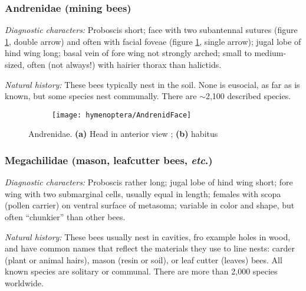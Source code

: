 \subsubsection{Andrenidae (mining bees)}
\noindent{}\textit{Diagnostic characters:} Proboscis short; face with two subantennal sutures (figure \ref{fig:andrenid1}, double arrow) and often with facial foveae (figure \ref{fig:andrenid1}, single arrow); jugal lobe of hind wing long; basal vein of fore wing not strongly arched; small to medium-sized, often (not always!) with hairier thorax than halictids.\vspace{3mm}

\noindent{}\textit{Natural history:} These bees typically nest in the soil. None is eusocial, as far as is known, but some species nest communally. There are $\sim$2,100 described species.

\begin{figure}[ht!]
    \centering
    \begin{subfigure}[ht!]{0.26\textwidth}
        \texttt{[image: hymenoptera/AndrenidFace]}
        \caption{}
        \label{fig:andrenid1}
    \end{subfigure}
    \qquad
    \begin{subfigure}[ht!]{0.35\textwidth}
        \caption{}
        \label{fig:andrenid2}
    \end{subfigure}
    \caption{Andrenidae. \textbf{(a)} Head in anterior view \citep[][pg. 313]{goulet1993hymenoptera}; \textbf{(b)} habitus \citep[][Fig. 116]{goulet1993hymenoptera}}\label{fig:andrenids}
\end{figure}

\subsubsection{Megachilidae (mason, leafcutter bees, \textit{etc}.)}
\noindent{}\textit{Diagnostic characters:} Proboscis rather long; jugal lobe of hind wing short; fore wing with two submarginal cells, usually equal in length; females with scopa (pollen carrier) on ventral surface of metasoma; variable in color and shape, but often ``chunkier'' than other bees.\vspace{3mm}

\noindent{}\textit{Natural history:} These bees usually nest in cavities, fro example holes in wood, and have common names that reflect the materials they use to line nests: carder (plant or animal hairs), mason (resin or soil), or leaf cutter (leaves) bees. All known species are solitary or communal. There are more than 2,000 species worldwide.

